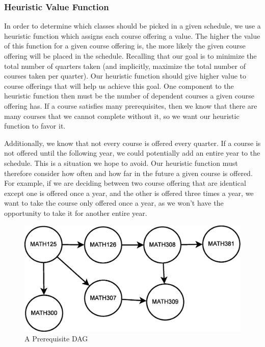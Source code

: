 \documentclass[11pt]{article} %
\begin{document}
\subsubsection{Heuristic Value Function} In order to determine which classes
should be picked in a given schedule, we use a heuristic function which assigns
each course offering a value. The higher the value of this function for a given
course offering is, the more likely the given course offering will be placed in
the schedule. Recalling that our goal is to minimize the total number of
quarters taken (and implicitly, maximize the total number of courses taken per
quarter). Our heuristic function should give higher value to course offerings
that will help us achieve this goal. One component to the heuristic function
then must be the number of dependent courses a given course offering has. If
a course satisfies many prerequisites, then we know that there are many courses
that we cannot complete without it, so we want our heuristic function to favor
it. 

Additionally, we know that not every course is offered every quarter. If
a course is not offered until the following year, we could potentially add an
entire year to the schedule. This is a situation we hope to avoid. Our heuristic
function must therefore consider how often and how far in the future a given
course is offered. For example, if we are deciding between two course offering
that are identical except one is offered once a year, and the other is offered
three times a year, we want to take the course only offered once a year, as we
won't have the opportunity to take it for another entire year.

\begin{figure} [ht]
    \begin{center}
        \includegraphics[scale=0.35]{more_prereq_tree}
    \end{center}
    \caption{A Prerequisite DAG}
    \label{prereq}
\end{figure}
\end{document}
